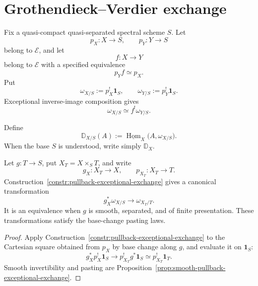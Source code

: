 \section{Grothendieck--Verdier exchange}
\label{sec:six-verdier-duality}

Fix a quasi-compact quasi-separated spectral scheme \(S\).  Let
\[
    p_X:X\longrightarrow S,
    \qquad
    p_Y:Y\longrightarrow S
\]
belong to \(\mathcal E\), and let
\[
    f:X\longrightarrow Y
\]
belong to \(\mathcal E\) with a specified equivalence
\[
    p_Yf\simeq p_X.
\]
Put
\[
    \omega_{X/S}:=p_X^!\mathbf1_S,
    \qquad
    \omega_{Y/S}:=p_Y^!\mathbf1_S.
\]
Exceptional inverse-image composition gives
\[
    \omega_{X/S}
    \simeq
    f^!\omega_{Y/S}.
\]

\begin{definition}
\label{def:verdier-duality-functor}
Define
\[
    \mathbb D_{X/S}(A)
    :=
    \underline{\operatorname{Hom}}_X
    \bigl(
      A,
      \omega_{X/S}
    \bigr).
\]
When the base \(S\) is understood, write simply \(\mathbb D_X\).
\end{definition}

\begin{proposition}
\label{prop:dualizing-object-base-change}
Let \(g:T\to S\), put \(X_T=X\times_ST\), and write
\[
    g_X:X_T\longrightarrow X,
    \qquad
    p_{X_T}:X_T\longrightarrow T.
\]
Construction~\ref{constr:pullback-exceptional-exchange} gives a canonical
transformation
\[
    g_X^*\omega_{X/S}
    \longrightarrow
    \omega_{X_T/T}.
\]
It is an equivalence when \(g\) is smooth, separated, and of finite
presentation.  These transformations satisfy the base-change pasting laws.
\end{proposition}

\begin{proof}
Apply Construction~\ref{constr:pullback-exceptional-exchange} to the
Cartesian square obtained from \(p_X\) by base change along \(g\), and
evaluate it on \(\mathbf1_S\):
\[
    g_X^*p_X^!\mathbf1_S
    \longrightarrow
    p_{X_T}^!g^*\mathbf1_S
    \simeq
    p_{X_T}^!\mathbf1_T.
\]
Smooth invertibility and pasting are
Proposition~\ref{prop:smooth-pullback-exceptional-exchange}.
\end{proof}

